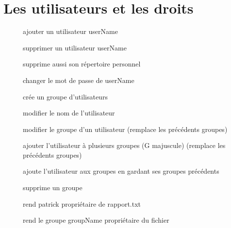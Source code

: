 \documentclass[letterpaper,10pt,french]{sphinxmanual}
\begin{document}
\chapter{Les utilisateurs et les droits}
\label{\detokenize{09-utilisateurs:les-utilisateurs-et-les-droits}}\label{\detokenize{09-utilisateurs::doc}}\begin{description}
\item[{}] \leavevmode
ajouter un utilisateur userName

\item[{}] \leavevmode
supprimer un utilisateur userName

\item[{}] \leavevmode
supprime aussi son répertoire personnel

\item[{}] \leavevmode
changer le mot de passe de userName

\item[{}] \leavevmode
crée un groupe d’utilisateurs

\item[{}] \leavevmode
modifier le nom de l’utilisateur

\item[{}] \leavevmode
modifier le groupe d’un utilisateur (remplace les précédents groupes)

\item[{}] \leavevmode
ajouter l’utilisateur à plusieurs groupes (G majuscule) (remplace les précédents groupes)

\item[{}] \leavevmode
ajoute l’utilisateur aux groupes en gardant ses groupes précédents

\item[{}] \leavevmode
supprime un groupe

\item[{}] \leavevmode
rend patrick propriétaire de rapport.txt

\item[{}] \leavevmode
rend le groupe groupName propriétaire du fichier


\end{description}
\end{document}
